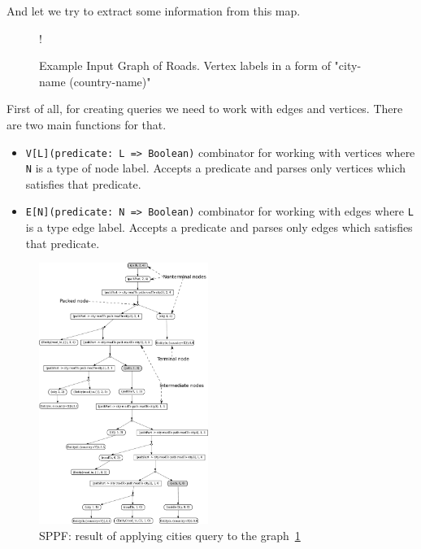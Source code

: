 And let we try to extract some information from this map.


\begin{figure}[h]
 {!}
{
}
\caption{Example Input Graph of Roads. Vertex labels in a form of "city-name (country-name)"}
\label{fig:graph}
\end{figure}

First of all, for creating queries we need to work with edges and vertices.
There are two main functions for that.
\begin{itemize}
    \item \lstinline{V[L](predicate: L => Boolean)} combinator for working with vertices where \lstinline{N} is a type of node label. 
    Accepts a predicate and parses only vertices which satisfies that predicate.
    \item \lstinline{E[N](predicate: N => Boolean)} combinator for working with edges where \lstinline{L} is a type edge label. 
    Accepts a predicate and parses only edges which satisfies that predicate.  
\end{itemize}

\begin{figure}[h]
\includegraphics[width=0.49\textwidth]{sppf}
\caption{SPPF: result of applying cities query to the graph~\ref{fig:graph}}
\label{fig:sppf}
\end{figure}




